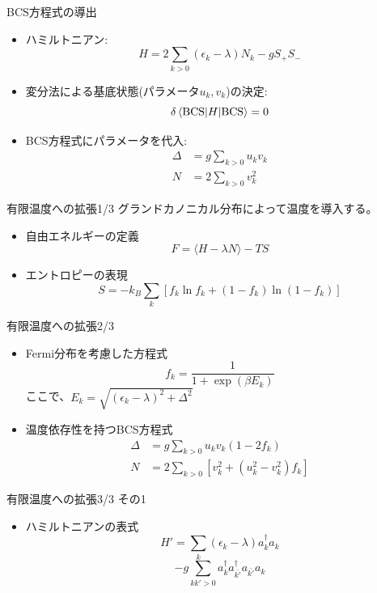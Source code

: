\documentclass[aspectratio=169, 12pt, dvipdfmx]{beamer}
\begin{document}
\begin{frame}{BCS方程式の導出}
  \begin{itemize}
    \item ハミルトニアン:
    \[
      H = 2\sum_{k>0} (\epsilon_k - \lambda) N_k - g S_+ S_-
    \]
    \item 変分法による基底状態(パラメータ\(u_k,v_k\))の決定:
    \[
    \delta\ev**{H}{\text{BCS}}=0
    \]
    \item BCS方程式にパラメータを代入:
    \begin{align}
      \Delta &=g\sum_{k>0}u_k v_k \\
      N      &= 2\sum_{k>0} v_k^2
    \end{align}
  \end{itemize}
\end{frame}

\begin{frame}{有限温度への拡張1/3}
  グランドカノニカル分布によって温度を導入する。
  \begin{itemize}
    \item 自由エネルギーの定義
    \[
    F = \langle H - \lambda N \rangle -TS 
    \]
    \item エントロピーの表現
    \[
    S = -k_B \sum_{k}\left[f_k \ln f_k +(1 -f_k)\ln (1-f_k) \right]
    \]
  \end{itemize}
\end{frame}

\begin{frame}{有限温度への拡張2/3}
  \begin{itemize}
    \item Fermi分布を考慮した方程式
    \[
    f_k = \frac{1}{1+\exp(\beta E_k)}
    \]ここで、\(E_k = \sqrt{(\epsilon_k-\lambda)^2 +\Delta^2}\)
    \item 温度依存性を持つBCS方程式
    \begin{align}
      \Delta &= g\sum_{k>0} u_k v_k(1 -2f_k)\\
      N      &= 2\sum_{k>0} \left[v_k^2 + (u_k^2-v_k^2)f_k\right]
    \end{align}
  \end{itemize}
\end{frame}

\begin{frame}{有限温度への拡張3/3 その1}
  \begin{itemize}
    \item ハミルトニアンの表式
    \[
      H'=\sum_{k}(\epsilon_k - \lambda)a^{\dagger}_ka_k
    \]
    \[
      -g\sum_{kk'>0}a^{\dagger}_{k}a^{\dagger}_{\bar{k'}}a_{\bar{k'}}a_{k}
    \]
  \end{itemize}
\end{frame}
\end{document}
